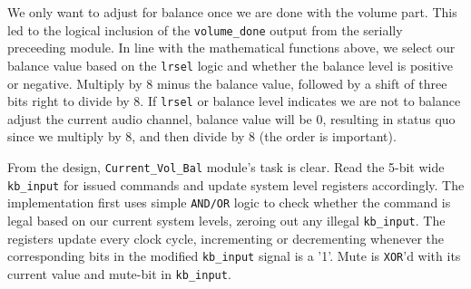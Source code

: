 We only want to adjust for balance once we are done with the volume part. This led to the logical inclusion of the \texttt{volume\_done} output from the serially preceeding module. In line with the mathematical functions above, we select our balance value based on the \texttt{lrsel} logic and whether the balance level is positive or negative. Multiply by 8 minus the balance value, followed by a shift of three bits right to divide by 8. If \texttt{lrsel} or balance level indicates we are not to balance adjust the current audio channel, balance value will be 0, resulting in status quo since we multiply by 8, and then divide by 8 (the order is important).
	
From the design, \texttt{Current\_Vol\_Bal} module's task is clear. Read the 5-bit wide \texttt{kb\_input} for issued commands and update system level registers accordingly. The implementation first uses simple \texttt{AND/OR} logic to check whether the command is legal based on our current system levels, zeroing out any illegal \texttt{kb\_input}. The registers update every clock cycle, incrementing or decrementing whenever the corresponding bits in the modified \texttt{kb\_input} signal is a '1'. Mute is \texttt{XOR}'d with its current value and mute-bit in \texttt{kb\_input}.	

